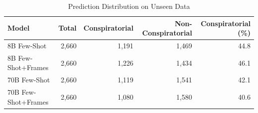 \begin{table}[t]
\centering
\caption{Prediction Distribution on Unseen Data}
\label{tab:llm_unseen_distribution}
\begin{tabular}{lrrrr}
\toprule
Model & Total & Conspiratorial & Non-Conspiratorial & Conspiratorial (\%) \\
\midrule
8B Few-Shot & 2,660 & 1,191 & 1,469 & 44.8 \\
8B Few-Shot+Frames & 2,660 & 1,226 & 1,434 & 46.1 \\
70B Few-Shot & 2,660 & 1,119 & 1,541 & 42.1 \\
70B Few-Shot+Frames & 2,660 & 1,080 & 1,580 & 40.6 \\
\bottomrule
\end{tabular}
\end{table}
